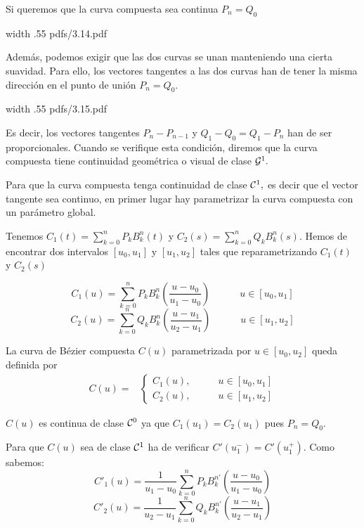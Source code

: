 \documentclass[twoside]{report}
\newcommand{\colocapdf}[2]{\quad\pdfimage width #2 {pdfs/#1.pdf}}
\begin{document}
Si queremos que la curva compuesta sea continua $P_n=Q_0$

\begin{center}
\colocapdf{3.14}{.55\textwidth}
\end{center}

Además, podemos exigir que las dos curvas se unan manteniendo una cierta suavidad. Para ello, los vectores tangentes a las dos curvas han de tener la misma dirección en el punto de unión $P_n=Q_0.$

\begin{center}
\colocapdf{3.15}{.55\textwidth}
\end{center}

Es decir, los vectores tangentes $P_n-P_{n-1}$ y $Q_1-Q_0=Q_1-P_n$ han de ser proporcionales. Cuando se verifique esta condición, diremos que la curva compuesta tiene continuidad geométrica o visual de clase ${\cal G}^1.$

Para que la curva compuesta tenga continuidad de clase ${\cal C}^1,$ es decir que el vector tangente sea continuo, en primer lugar hay parametrizar la curva compuesta con un parámetro global.

\vspace{0.3cm}

Tenemos $C_1(t)=\sum_{k=0}^n P_k B_k^n(t)$ y $C_2(s)=\sum_{k=0}^n Q_k B_k^n(s)$. Hemos de encontrar dos intervalos $[u_0,u_1]$ y $[u_1,u_2]$ tales que reparametrizando $C_1(t)$ y $C_2(s)$

$$C_1(u)=\sum_{k=0}^n P_k B_k^n\left(\frac{u-u_0}{u_1-u_0}\right) \quad \quad \quad u\in [u_0,u_1]$$
$$C_2(u)=\sum_{k=0}^n Q_k B_k^n\left(\frac{u-u_1}{u_2-u_1}\right)\quad \quad \quad u\in [u_1,u_2]$$

La curva de Bézier compuesta $C(u)$ parametrizada por $u\in[u_0,u_2]$ queda definida por
$$\begin{array}{cc} C(u)=& \left\{\begin{array}{cc} C_1(u), & \quad \quad u\in [u_0,u_1]\\ C_2(u), & \quad \quad u\in [u_1,u_2]\end{array}\right. \end{array}$$

$C(u)$ es continua de clase ${\cal C}^0$ ya que $C_1(u_1)=C_2(u_1)$ pues $P_n=Q_0.$

Para que $C(u)$ sea de clase ${\cal C}^1$ ha de verificar $C'(u_1^{-})=C'(u_1^{+}).$ Como sabemos:
$$C'_1(u)=\frac{1}{u_1-u_0}\sum_{k=0}^n P_k B_k^{n \prime} \left(\frac{u-u_0}{u_1-u_0}\right)$$
$$C'_2(u)=\frac{1}{u_2-u_1}\sum_{k=0}^n Q_k B_k^{n \prime} \left(\frac{u-u_1}{u_2-u_1}\right)$$
\end{document}
